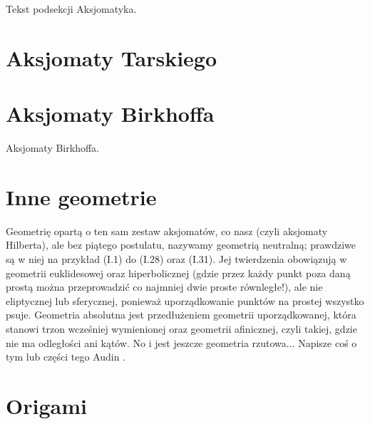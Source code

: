 %

Tekst podsekcji Aksjomatyka. \loremipsum

%

%

%

%

%
\section{Aksjomaty Tarskiego}
\loremipsum
{}
\cite{greenberg_2010}
%

\section{Aksjomaty Birkhoffa}
Aksjomaty Birkhoffa.
\loremipsum
{}

\section{Inne geometrie}
Geometrię opartą o ten sam zestaw aksjomatów, co nasz (czyli aksjomaty Hilberta), ale bez piątego postulatu, nazywamy geometrią neutralną; prawdziwe są w niej na przykład (I.1) do (I.28) oraz (I.31).
Jej twierdzenia obowiązują w geometrii euklidesowej oraz hiperbolicznej (gdzie przez każdy punkt poza daną prostą można przeprowadzić co najmniej dwie proste równległe!), ale nie eliptycznej lub sferycznej, ponieważ uporządkowanie punktów na prostej wszystko psuje.
Geometria absolutna jest przedłużeniem geometrii uporządkowanej, która stanowi trzon wcześniej wymienionej oraz geometrii afinicznej, czyli takiej, gdzie nie ma odległości ani kątów.
No i jest jeszcze geometria rzutowa...
Napisze coś o tym lub części tego Audin \cite[s. 13]{audin_2003}.



\section{Origami}

%